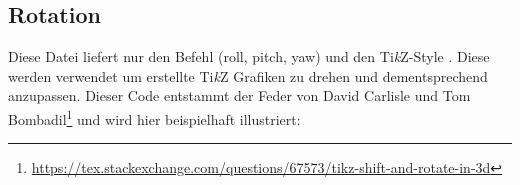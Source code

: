 \subsection{Rotation}
{\centering {}\vspace*{0.5\baselineskip}\par}
Diese Datei liefert nur den Befehl  (roll, pitch, yaw) und den Ti\textit{k}Z-Style . Diese werden verwendet um erstellte Ti\textit{k}Z Grafiken zu drehen und dementsprechend anzupassen. Dieser Code entstammt der Feder von David Carlisle und Tom Bombadil\footnote{\url{https://tex.stackexchange.com/questions/67573/tikz-shift-and-rotate-in-3d}} und wird hier beispielhaft illustriert:
\newcommand{\examplecube}%
{   \coordinate (a) at (-2,-2,-2);
    \coordinate (b) at (-2,-2,2);
    \coordinate (c) at (-2,2,-2);
    \coordinate (d) at (-2,2,2);
    \coordinate (e) at (2,-2,-2);
    \coordinate (f) at (2,-2,2);
    \coordinate (g) at (2,2,-2);
    \coordinate (h) at (2,2,2);
    \draw (a)--(b) (a)--(c) (a)--(e) (b)--(d) (b)--(f) (c)--(d) (c)--(g) (d)--(h) (e)--(f) (e)--(g) (f)--(h) (g)--(h);
    \fill[Ao] (a) circle (0.1cm);
    \fill[tealblue] (d) ++(0.1cm,0.1cm) rectangle ++(-0.2cm,-0.2cm);
}
